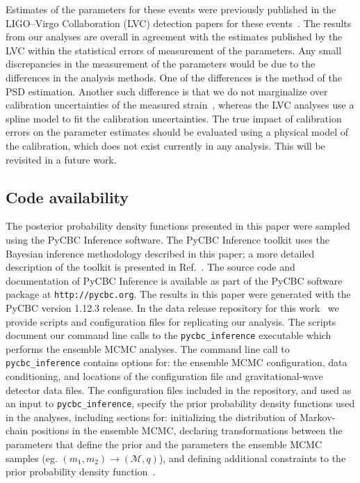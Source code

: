 Estimates of the parameters for these events were previously published in the LIGO--Virgo Collaboration (LVC) detection papers for these events~\cite{Abbott:2017vtc,Abbott:2017gyy,Abbott:2017oio,LIGOScientific:2018mvr}. The results from our analyses are overall in agreement with the estimates published by the LVC within the statistical errors of measurement of the parameters. Any small discrepancies in the measurement of the parameters would be due to the differences in the analysis methods. One of the differences is the method of the PSD estimation. Another such difference is that we do not marginalize over calibration uncertainties of the measured strain~\cite{PhysRevD.96.102001}, whereas the LVC analyses use a spline model to fit the calibration uncertainties. The true impact of calibration errors on the parameter estimates should be evaluated using a physical model of the calibration, which does not exist currently in any analysis. This will be revisited in a future work.

\subsection{Code availability}
The posterior probability density functions presented in this paper were sampled using the PyCBC Inference software. The PyCBC Inference toolkit uses the Bayesian inference methodology described in this paper; a more detailed description of the toolkit is presented in Ref.~\cite{Biwer:2018osg}. The source code and documentation of PyCBC Inference is available as part of the PyCBC software package at \verb"http://pycbc.org". The results in this paper were generated with the PyCBC version 1.12.3 release. In the data release repository for this work~\cite{data_release} we provide scripts and configuration files for replicating our analysis. The scripts document our command line calls to the \texttt{pycbc\_inference} executable which performs the ensemble MCMC analyses. The command line call to \texttt{pycbc\_inference} contains options for: the ensemble MCMC configuration, data conditioning, and locations of the configuration file and gravitational-wave detector data files. The configuration files included in the repository, and used as an input to \texttt{pycbc\_inference}, specify the prior probability density functions used in the analyses, including sections for: initializing the distribution of Markov-chain positions in the ensemble MCMC, declaring transformations between the parameters that define the prior and the parameters the ensemble MCMC samples (eg. $(m_1, m_2) \rightarrow (\mathcal{M}, q)$), and defining additional constraints to the prior probability density function~\cite{Biwer:2018osg}.


